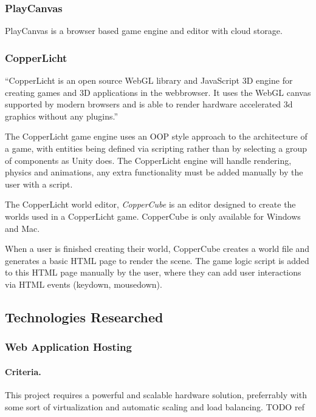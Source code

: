 \documentclass[a4paper, 12pt]{article}
\begin{document}

\subsubsection{PlayCanvas}
PlayCanvas is a browser based game engine and editor with cloud storage. 


\subsubsection{CopperLicht}
``CopperLicht is an open source WebGL library and JavaScript 3D engine for creating games and 3D applications in the webbrowser. It uses the WebGL canvas supported by modern browsers and is able to render hardware accelerated 3d graphics without any plugins.''


The CopperLicht game engine uses an OOP style approach to the architecture of a game, with entities being defined via scripting rather than by selecting a group of components as Unity does. The CopperLicht engine will handle rendering, physics and animations, any extra functionality must be added manually by the user with a script.


The CopperLicht world editor, \emph{CopperCube} is an editor designed to create the worlds used in a CopperLicht game. CopperCube is only available for Windows and Mac.


When a user is finished creating their world, CopperCube creates a world file and generates a basic HTML page to render the scene. The game logic script is added to this HTML page manually by the user, where they can add user interactions via HTML events (keydown, mousedown).



\subsection{Technologies Researched}
\subsubsection{Web Application Hosting}
\paragraph{Criteria.}
This project requires a powerful and scalable hardware solution, preferrably with some sort of virtualization and automatic scaling and load balancing. TODO ref
\end{document}
